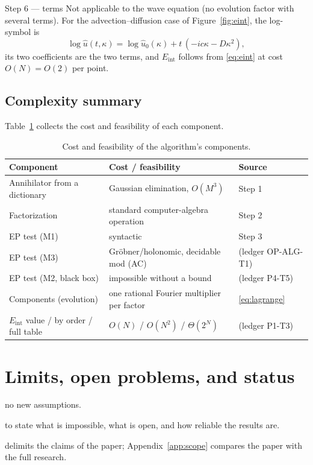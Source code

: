 \documentclass[11pt,a4paper]{article}
\theoremstyle{definition}
\newcommand{\led}[1]{\textcolor{cG}{\textsf{\footnotesize(ledger #1)}}}
\newcommand{\sectionbrief}[3]{\begin{leadin}\begin{description}[nosep,leftmargin=3.0cm,labelwidth=2.8cm]
  \item[Starting from] #1
  \item[Why this section] #2
  \item[Role in the paper] #3
  \end{description}\end{leadin}}
\newcommand{\Eint}{E_{\mathrm{int}}}
\begin{document}
\begin{wstep}{Step 6 --- terms}
Not applicable to the wave equation (no evolution factor with several terms). For the advection--diffusion case of Figure~\ref{fig:eint}, the log-symbol is
\[
\log\hat u(t,\kappa)=\log\hat u_0(\kappa)+t\,(-ic\kappa-D\kappa^2),
\]
its two coefficients are the two terms, and $\Eint$ follows from \eqref{eq:eint} at cost $O(N)=O(2)$ per point.
\end{wstep}

\subsection{Complexity summary}
Table~\ref{tab:complexity} collects the cost and feasibility of each component.
\begin{table}[!htb]
\centering
\small
\begin{tabular}{@{}lll@{}}
\toprule
Component & Cost / feasibility & Source\\\midrule
Annihilator from a dictionary & Gaussian elimination, $O(M^3)$ & Step 1\\
Factorization & standard computer-algebra operation & Step 2\\
EP test (M1) & syntactic & Step 3\\
EP test (M3) & Gr\"obner/holonomic, decidable mod (AC) & \led{OP-ALG-T1}\\
EP test (M2, black box) & impossible without a bound & \led{P4-T5}\\
Components (evolution) & one rational Fourier multiplier per factor & \eqref{eq:lagrange}\\
$\Eint$ value / by order / full table & $O(N)$ / $O(N^2)$ / $\Theta(2^N)$ & \led{P1-T3}\\
\bottomrule
\end{tabular}
\caption{Cost and feasibility of the algorithm's components.}\label{tab:complexity}
\end{table}

\section{Limits, open problems, and status}\label{sec:limits}
\sectionbrief
{no new assumptions.}
{to state what is impossible, what is open, and how reliable the results are.}
{delimits the claims of the paper; Appendix~\ref{app:scope} compares the paper with the full research.}
\end{document}
